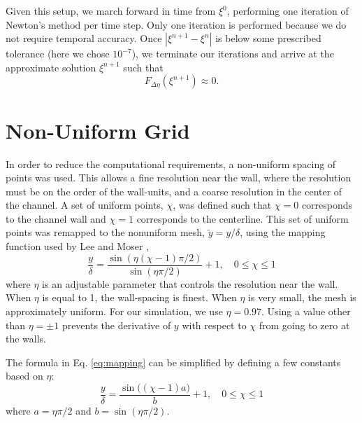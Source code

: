 \documentclass[a4paper,11pt]{article}
\begin{document}
Given this setup, we march forward in time from $\xi^0$, performing one
iteration of Newton's method per time step. Only one iteration is performed
because we do not require temporal accuracy. Once $|\xi^{n+1}-\xi^n|$ is below
some prescribed tolerance (here we chose $10^{-7}$), we terminate our iterations
and arrive at the approximate solution $\xi^{n+1}$ such that
\[
F_{\Delta \eta}(\xi^{n+1}) \approx 0 .
\]


\section{Non-Uniform Grid}
In order to reduce the computational requirements, a non-uniform spacing of points was used.  This allows a fine resolution near the wall, where the resolution must be on the order of the wall-units, and a coarse resolution in the center of the channel.  A set of uniform points, $\chi$, was defined such that $\chi=0$ corresponds to the channel wall and $\chi=1$ corresponds to the centerline.  This set of uniform points was remapped to the nonuniform mesh, $\tilde{y} = y/\delta$, using the mapping function used by Lee and Moser \cite{Lee},
\begin{equation} \label{eq:mapping}
 \frac{y}{\delta} = \frac{\sin(\eta (\chi-1) \pi/2)}{\sin(\eta \pi/2)}+1, \quad 0 \le \chi \le 1
\end{equation}
where $\eta$ is an adjustable parameter that controls the resolution near the wall. When $\eta$ is equal to 1, the wall-spacing is finest.  When $\eta$ is very small, the mesh is approximately uniform.  For our simulation, we use $\eta = 0.97$.  Using a value other than $\eta = \pm 1$ prevents the derivative of $y$ with respect to $\chi$ from going to zero at the walls.

The formula in Eq. \ref{eq:mapping} can be simplified by defining a few constants based on $\eta$:
\begin{equation}
 \frac{y}{\delta} = \frac{\sin\big((\chi-1)a\big)}{b}+1, \quad 0 \le \chi \le 1
\end{equation}
where $a = \eta \pi/2$ and $b = \sin (\eta \pi/2)$.
\end{document}
